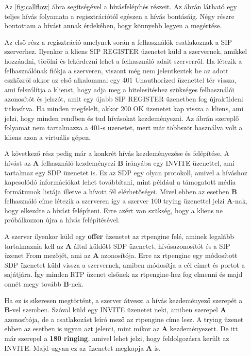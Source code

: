 Az \ref{fig:callflow} ábra segítségével a hívásfelépítés részeit.  Az ábrán látható 
egy teljes hívás folyamata a regisztrációtól egészen a hívás bontásáig. Négy részre 
bontottam a hívást annak érdekében, hogy könnyebb legyen a megértése.

Az első rész a regisztráció amelynek során a felhasználók csatlakoznak a SIP szerverhez.
Ilyenkor a kliens SIP REGISTER üzenetet küld a szervernek, amikkel hozzáadni, törölni és
lekérdezni lehet a felhasználó adait szerverről. Ha létezik a felhasználónak fiókja 
a szerveren, viszont még nem jelentkeztek be az adott eszközről akkor az első alkalommal 
egy 401 Unauthorized üzenettel tér vissza, ami felszólítja a klienst, hogy adja meg a 
hitelesítéshez szükséges felhasználói azonosítót és jelszót, amit egy újabb SIP REGISTER
üzenetben fog újraküldeni titkosítva. Ha minden megfelelt, akkor 200 OK üzenetet kap 
vissza a kliens, ami jelzi, hogy minden rendben és tud hívásokat kezdeményezni. Az ábrán
szereplő folyamat nem tartalmazza a 401-s üzenetet, mert már többször használva volt a 
kliens azon a virtuális gépen.

A következő rész pedig már a konkrét hívás kezdeményezése és felépítése. A hívást az 
\textbf{A} felhasználó kezdeményezi \textbf{B} irányába egy INVITE üzenettel, ami tartalmaz
egy SDP üzenetet is. Ez az SDP egy olyan protokoll, amivel a híváshoz kapcsolódó információkat
lehet továbbítani, mint például a támogatott média formátumok listája illetve a hívott fél
elérhetőségei. Mivel ebben az esetben \textbf{B} felhasználó címe létezik a szerveren így
a szerver 100 trying üzenettel jelzi \textbf{A}-nak, hogy elkezdte a hívást felépíteni. Erre
azért van szükség, hogy a kliens ne próbálkozzon újra a hívás felépítésével.

A szerver ilyenkor küld egy \textbf{offer} üzenetet az rtpengine felé, aminek legalább 
tartalmaznia kell az \textbf{A} által küldött SDP üzenetet, hívásazonosítót és a SIP üzenet
From mezőjét, ami az \textbf{A} azonosítója. Erre az rtpengine egy módosított SDP üzenetet küld
vissza a szervernek, amiben módosítja a cél címet és portot a sajátjára. Így minden RTP
üzenet elsőnek az rtpengine-hez fog elmenni és majd onnét megy tovább \textbf{B}-nek.

Ha ez is sikeresen megtörtént, a szerver átveszi a hívás kezdeményező szerepét a \textbf{B}-vel
szemben. Szóval küld egy INVITE üzenetet neki, amiben szerepel \textbf{A} azonosítója, de
a csatlakozást leíró mező az rtpengine címe lesz. A trying üzenet ebben az esetben is 
ugyan azt jelenti, mint mikor az \textbf{A} kezdeményezett. De itt már szerepel a 
\textbf{180 ringing}, amivel lehet jelzi, hogy feldolgozásra került az INVITE. Majd ugyan ez 
az üzenetet megkapja \textbf{A} is. 

